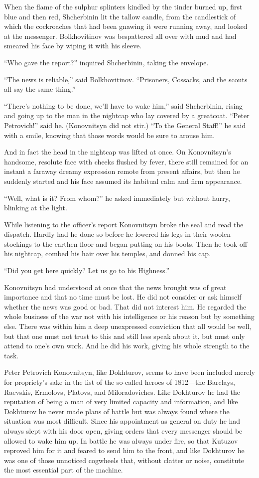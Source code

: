 When the flame of the sulphur splinters kindled by the tinder
burned up, first blue and then red, Shcherbinin lit the tallow
candle, from the candlestick of which the cockroaches that had
been gnawing it were running away, and looked at the
messenger. Bolkhovitinov was bespattered all over with mud and
had smeared his face by wiping it with his sleeve.

``Who gave the report?'' inquired Shcherbinin, taking the
envelope.

``The news is reliable,'' said Bolkhovitinov. ``Prisoners,
Cossacks, and the scouts all say the same thing.''

``There's nothing to be done, we'll have to wake him,'' said
Shcherbi\-nin, rising and going up to the man in the nightcap who
lay covered by a greatcoat. ``Peter Petrovich!'' said
he. (Konovnitsyn did not stir.) ``To the General Staff!'' he said
with a smile, knowing that those words would be sure to arouse
him.

And in fact the head in the nightcap was lifted at once. On
Konovnitsyn's handsome, resolute face with cheeks flushed by
fever, there still remained for an instant a faraway dreamy
expression remote from present affairs, but then he suddenly
started and his face assumed its habitual calm and firm
appearance.

``Well, what is it? From whom?'' he asked immediately but without
hurry, blinking at the light.

While listening to the officer's report Konovnitsyn broke the
seal and read the dispatch. Hardly had he done so before he
lowered his legs in their woolen stockings to the earthen floor
and began putting on his boots. Then he took off his nightcap,
combed his hair over his temples, and donned his cap.

``Did you get here quickly? Let us go to his Highness.''

Konovnitsyn had understood at once that the news brought was of
great importance and that no time must be lost. He did not
consider or ask himself whether the news was good or bad. That
did not interest him. He regarded the whole business of the war
not with his intelligence or his reason but by something
else. There was within him a deep unexpressed conviction that all
would be well, but that one must not trust to this and still less
speak about it, but must only attend to one's own work.  And he
did his work, giving his whole strength to the task.

Peter Petrovich Konovnitsyn, like Dokhturov, seems to have been
included merely for propriety's sake in the list of the so-called
heroes of 1812---the Barclays, Raevskis, Ermolovs, Platovs, and
Miloradoviches. Like Dokhturov he had the reputation of being a
man of very limited capacity and information, and like Dokhturov
he never made plans of battle but was always found where the
situation was most difficult. Since his appointment as general on
duty he had always slept with his door open, giving orders that
every messenger should be allowed to wake him up. In battle he
was always under fire, so that Kutuzov reproved him for it and
feared to send him to the front, and like Dokhturov he was one of
those unnoticed cogwheels that, without clatter or noise,
constitute the most essential part of the machine.

